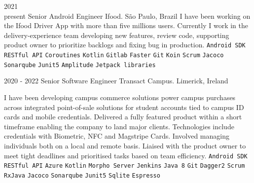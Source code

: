 \documentclass[9pt]{developercv} %
\begin{document}
\begin{entrylist}
	\entry
		{2021\\\footnotesize{present}}
		{Senior Android Engineer}
		{Ifood. São Paulo, Brazil}
{
I have been working on the Ifood Driver App with more than five millions users. Currently I work in the delivery-experience team developing new features, review code, supporting product owner to prioritize backlogs and fixing bug in production.
 	{
 		\texttt{Android SDK}\slashsep
		 \texttt{RESTful API}\slashsep
		 \texttt{Coroutines}\slashsep
		 \texttt{Kotlin}\slashsep
		 \texttt{Gitlab}\slashsep
		 \texttt{Faster}\slashsep
		 \texttt{Git}\slashsep
		 \texttt{Koin}\slashsep
		 \texttt{Scrum}\slashsep
		 \texttt{Jacoco}\slashsep
		 \texttt{Sonarqube}\slashsep
		 \texttt{Junit5}\slashsep
		 \texttt{Amplitude}\slashsep
		 \texttt{Jetpack libraries}\slashsep
	}
}

\end{entrylist}
\begin{entrylist}
	\entry
		{2020 - 2022}
		{Senior Software Engineer}
		{Transact Campus. Limerick, Ireland}
{

I have been developing campus commerce solutions power campus purchases across integrated point-of-sale solutions for student accounts tied to campus ID cards and mobile credentials. Delivered a fully featured product within a short timeframe enabling the company to land major clients. Technologies include credentials with Biometric, NFC and Magstripe Cards. 
\newline
\newline
Involved managing individuals both on a local and remote basis. Liaised with the product owner to meet tight deadlines and prioritised tasks based on team efficiency.
 	{
 		\texttt{Android SDK}\slashsep
		 \texttt{RESTful API}\slashsep
		 \texttt{Azure}\slashsep
		 \texttt{Kotlin}\slashsep
		 \texttt{Morpho Server}\slashsep
		 \texttt{Jenkins}\slashsep
		 \texttt{Java 8}\slashsep
		 \texttt{Git}\slashsep
		 \texttt{Dagger2}\slashsep
		 \texttt{Scrum}\slashsep
		 \texttt{RxJava}\slashsep
		 \texttt{Jacoco}\slashsep
		 \texttt{Sonarqube}\slashsep
		 \texttt{Junit5}\slashsep
		 \texttt{Sqlite}\slashsep
		 \texttt{Espresso}\slashsep
	}
}

\end{entrylist}
\end{document}
